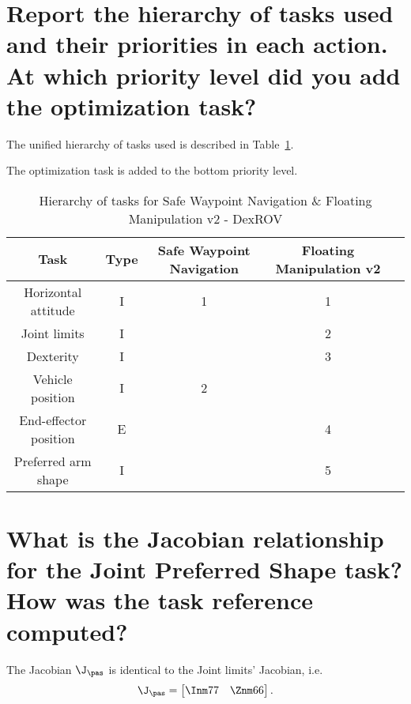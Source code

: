 	\begin{parts}
		\part{Report the hierarchy of tasks used and their priorities in
		each action. At which priority level did you add the optimization task?}
		
		\begin{solutionorbox}
			The unified hierarchy of tasks used is described in
			Table~\ref{table:tkip_swn_fmv2_dexrov}. 
	
			The optimization task is added to the bottom priority
			level.
		\end{solutionorbox}
		
		\begin{table}[htb] 
			\caption{Hierarchy of tasks for Safe Waypoint Navigation
			\& Floating Manipulation v2 - DexROV}
			\label{table:tkip_swn_fmv2_dexrov}
			\begin{center}
				\footnotesize
				\begin{tabular}{ccccc}
					\toprule Task & Type &
					Safe Waypoint Navigation & Floating
					Manipulation v2\\
					\midrule 
					\hdashline  Horizontal attitude & I & 1
									& 1\\ 
					\hdashline Joint limits & I && 2\\
					\hdashline Dexterity & I && 3\\
					\hdashline Vehicle position & I & 2 \\ 
					\hdashline End-effector position & E
									 &&4\\ 
					\hdashline Preferred arm shape & I
									 &&5\\ 
					\bottomrule
				\end{tabular}%
			\end{center}%
		\end{table}%

		\part{What is the Jacobian relationship for the Joint Preferred
		Shape task? How was the task reference computed?}

		\begin{solutionorbox}
			The Jacobian $\J_{\pas}$ is identical to the Joint
			limits' Jacobian, i.e.
			\[
				\J_{\pas} = \begin{bmatrix}
					\Inm77\quad
					\Znm66
				\end{bmatrix}
				\mathrm{.}
			\]


\end{solutionorbox}
\end{parts}

